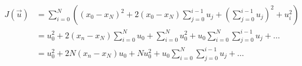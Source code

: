 \documentclass{article}
\begin{document}
\thispagestyle{empty}

\begin{align*}
J(\vec{u}) & = \sum\limits_{i=0}^N \left((x_0-x_N)^2 + 2(x_0-x_N)\sum\limits_{j=0}^{i-1}u_j+\left(\sum\limits_{j=0}^{i-1}u_j\right)^2 + u_i^2\right)\\
& = u_0^2 + 2(x_n-x_N)\sum\limits_{i=0}^N u_0 +  \sum\limits_{i=0}^N u_0^2 + u_0 \sum\limits_{i=0}^N \sum\limits_{j=0}^{i-1}u_j + \dots\\
& = u_0^2 + 2N(x_n-x_N) u_0 + N u_0^2 +  u_0  \sum\limits_{i=0}^N \sum\limits_{j=0}^{i-1}u_j + \dots
\end{align*}
\end{document}

